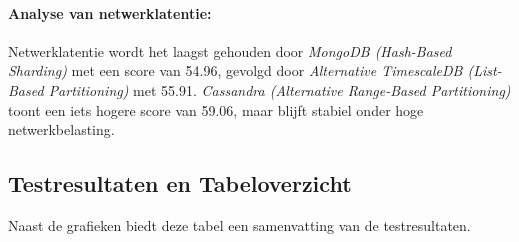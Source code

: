 \paragraph{Analyse van netwerklatentie:}
Netwerklatentie wordt het laagst gehouden door \textit{MongoDB (Hash-Based Sharding)} met een score van 54.96, gevolgd door \textit{Alternative TimescaleDB (List-Based Partitioning)} met 55.91. \textit{Cassandra (Alternative Range-Based Partitioning)} toont een iets hogere score van 59.06, maar blijft stabiel onder hoge netwerkbelasting.

\subsection{Testresultaten en Tabeloverzicht}
Naast de grafieken biedt deze tabel een samenvatting van de testresultaten.

